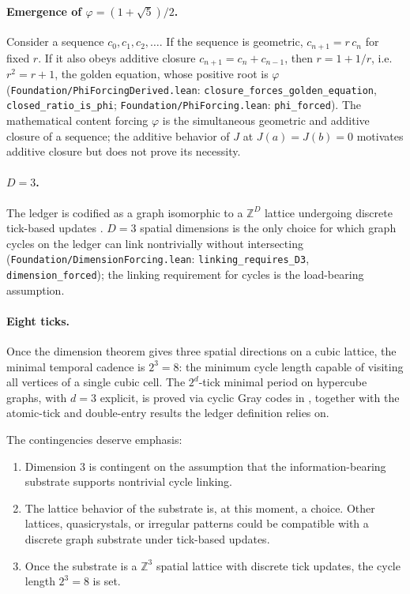 \documentclass[11pt,letterpaper]{article}
\newcommand{\lean}[1]{\texttt{#1}}
\begin{document}
\paragraph{Emergence of $\varphi=(1+\sqrt{5})/2$.} Consider a sequence $c_{0},c_{1},c_{2},\dots$. If the sequence is geometric, $c_{n+1}=r\,c_{n}$ for fixed $r$. If it also obeys additive closure $c_{n+1}=c_{n}+c_{n-1}$, then $r=1+1/r$, i.e.\ $r^{2}=r+1$, the golden equation, whose positive root is $\varphi$ (\lean{Foundation/PhiForcingDerived.lean}: \lean{closure\_forces\_golden\_equation}, \lean{closed\_ratio\_is\_phi}; \lean{Foundation/PhiForcing.lean}: \lean{phi\_forced}). The mathematical content forcing $\varphi$ is the simultaneous geometric and additive closure of a sequence; the additive behavior of $J$ at $J(a)=J(b)=0$ motivates additive closure but does not prove its necessity.

\paragraph{$D=3$.} The ledger is codified as a graph isomorphic to a $\mathbb{Z}^{D}$ lattice undergoing discrete tick-based updates \cite{CoherentComparisonLedger}. $D=3$ spatial dimensions is the only choice for which graph cycles on the ledger can link nontrivially without intersecting (\lean{Foundation/DimensionForcing.lean}: \lean{linking\_requires\_D3}, \lean{dimension\_forced}); the linking requirement for cycles is the load-bearing assumption.

\paragraph{Eight ticks.} Once the dimension theorem gives three spatial directions on a cubic lattice, the minimal temporal cadence is $2^{3}=8$: the minimum cycle length capable of visiting all vertices of a single cubic cell. The $2^{d}$-tick minimal period on hypercube graphs, with $d=3$ explicit, is proved via cyclic Gray codes in \cite{CoherentComparisonLedger}, together with the atomic-tick and double-entry results the ledger definition relies on.

The contingencies deserve emphasis:
\begin{enumerate}
\item Dimension 3 is contingent on the assumption that the information-bearing substrate supports nontrivial cycle linking.
\item The lattice behavior of the substrate is, at this moment, a choice. Other lattices, quasicrystals, or irregular patterns could be compatible with a discrete graph substrate under tick-based updates.
\item Once the substrate is a $\mathbb{Z}^{3}$ spatial lattice with discrete tick updates, the cycle length $2^{3}=8$ is set.
\end{enumerate}
\end{document}
